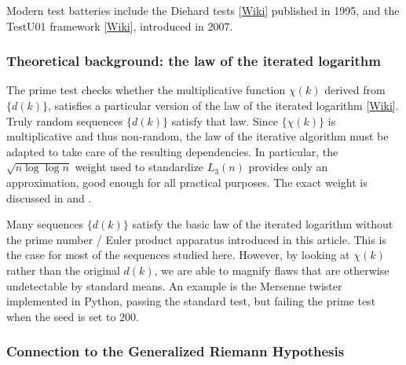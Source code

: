 \documentclass[oneside,10pt]{book}
\begin{document}
Modern test batteries
 include the \textcolor{index}{Diehard tests} [\href{https://en.wikipedia.org/wiki/Diehard_tests}{Wiki}] published in 1995, and the
 \textcolor{index}{TestU01} framework [\href{https://en.wikipedia.org/wiki/TestU01}{Wiki}], introduced in 2007.



\subsubsection{Theoretical background: the law of the iterated logarithm}

The prime test checks whether the multiplicative function $\chi(k)$ derived from $\{d(k)\}$, satisfies a particular version of the
 \textcolor{index}{law of the iterated logarithm} [\href{https://en.wikipedia.org/wiki/Law_of_the_iterated_logarithm}{Wiki}]. Truly random sequences $\{d(k)\}$ satisfy that law. Since $\{\chi(k)\}$ is multiplicative and thus non-random, the law of the iterative algorithm
 must be adapted to take care of the resulting dependencies. In particular, the $\sqrt{n\log\log n}$ weight used to standardize
  $L_3(n)$  provides only an approximation, good enough for all practical purposes. The exact weight is discussed in
  \cite{harper2020} and \cite{yukkam2013}.

Many sequences $\{d(k)\}$ satisfy the basic law of the iterated logarithm without the prime number / Euler product apparatus introduced
 in this article. This is the case for most of the sequences studied here. However, by looking at $\chi(k)$ rather than the original
 $d(k)$, we are able to magnify flaws that are otherwise undetectable by standard means. An example is the Mersenne twister
  implemented in Python, passing the standard test, but failing the prime test when the seed is set to $200$.

\subsubsection{Connection to the Generalized Riemann Hypothesis}
\end{document}
